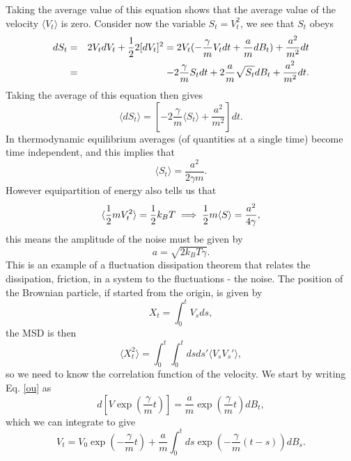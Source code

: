\documentclass[11pt]{report}
\begin{document}
Taking the average value of this equation shows that the average value of the velocity $\langle V_t\rangle $ is zero. Consider now the variable $S_t= V_t^2$, we see that $S_t$ obeys
\begin{eqnarray}
dS_t &=& 2V_t dV_t + {1\over 2} 2 [dV_t]^2 = 2V_t(-\frac{\gamma}{m} V_t dt + \frac{a}{m} dB_t) + \frac{a^2}{m^2} dt\nonumber \\
&=& -2 \frac{\gamma}{m} S_t dt + 2\frac{a}{m}\sqrt{S_t} dB_t + \frac{a^2}{m^2} dt.
 \end{eqnarray} 
 Taking the average of this equation then gives
 \begin{equation}
 \langle dS_t\rangle  =[ -2\frac{\gamma}{m} \langle S_t\rangle   + \frac{a^2}{m^2} ] dt.
 \end{equation}
 In thermodynamic equilibrium averages (of quantities at a single time) become time independent, and this implies that
 \begin{equation}
 \langle S_t\rangle = \frac{a^2}{2\gamma m}.
 \end{equation}
 However equipartition of energy also tells us that
 \begin{equation}
 \langle{1\over 2}m V_t^2\rangle = {1\over 2}k_BT \implies {1\over 2}m\langle S\rangle = \frac{a^2}{4\gamma},
 \end{equation}
this means the amplitude of the noise must be given by
\begin{equation}
a= \sqrt{2k_BT\gamma}.
\end{equation}
This is an example of a fluctuation dissipation theorem that relates the dissipation, friction, in a system to the fluctuations - the noise. The position of the Brownian particle, if started from the origin, is given by
\begin{equation}
X_t = \int_0^t V_s ds,
\end{equation}
the MSD is then
\begin{equation}
\langle X^2_t\rangle = \int_0^t \int_0^t ds ds' \langle V_sV_s'\rangle,
\end{equation}
so we need to know the correlation function of the velocity. We start by writing Eq. \eqref{ou} as
\begin{equation}
d[V\exp(\frac{\gamma}{m} t)] = \frac{a}{m}\exp(\frac{\gamma}{m} t) dB_t,
\end{equation}
which  we can integrate to give
\begin{equation}
V_t = V_0\exp(-\frac{\gamma}{m} t) + \frac{a}{m}\int_0^t ds \exp\left(-\frac{\gamma}{m}(t-s)\right)dB_s.
\end{equation}
\end{document}
